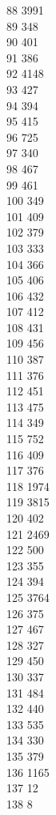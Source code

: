{ 88	3991 \\
 89	348 \\
 90	401 \\
 91	386 \\
 92	4148 \\
 93	427 \\
 94	394 \\
 95	415 \\
 96	725 \\
 97	340 \\
 98	467 \\
 99	461 \\
 100	349 \\
 101	409 \\
 102	379 \\
 103	333 \\
 104	366 \\
 105	406 \\
 106	432 \\
 107	412 \\
 108	431 \\
 109	456 \\
 110	387 \\
 111	376 \\
 112	451 \\
 113	475 \\
 114	349 \\
 115	752 \\
 116	409 \\
 117	376 \\
 118	1974 \\
 119	3815 \\
 120	402 \\
 121	2469 \\
 122	500 \\
 123	355 \\
 124	394 \\
 125	3764 \\
 126	375 \\
 127	467 \\
 128	327 \\
 129	450 \\
 130	337 \\
 131	484 \\
 132	440 \\
 133	535 \\
 134	330 \\
 135	379 \\
 136	1165 \\
 137	12 \\
 138	8 \\
}
